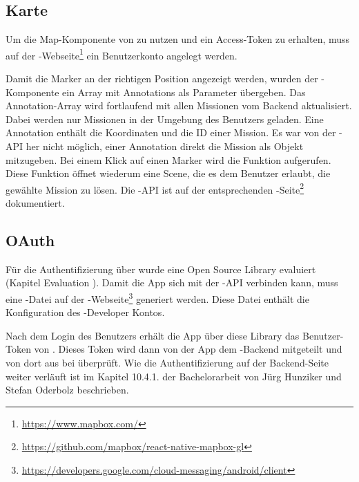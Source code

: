 \subsection{Karte}
Um die Map-Komponente von  zu nutzen und ein Access-Token zu erhalten, muss auf der -Webseite\footnote{\url{https://www.mapbox.com/}} ein Benutzerkonto angelegt werden. 

Damit die Marker an der richtigen Position angezeigt werden, wurden der -Komponente ein Array mit Annotations als Parameter übergeben. 
Das Annotation-Array wird fortlaufend mit allen Missionen vom \gls{Backend} aktualisiert. 
Dabei werden nur Missionen in der Umgebung des Benutzers geladen. 
Eine Annotation enthält die Koordinaten und die ID einer Mission. 
Es war von der -\gls{API} her nicht möglich, einer Annotation direkt die Mission als Objekt mitzugeben. 
Bei einem Klick auf einen Marker wird die Funktion  aufgerufen.
Diese Funktion öffnet wiederum eine Scene, die es dem Benutzer erlaubt, die gewählte Mission zu lösen.
Die -\gls{API} ist auf der entsprechenden -Seite\footnote{\url{https://github.com/mapbox/react-native-mapbox-gl}} dokumentiert. 


\subsection{OAuth}
Für die Authentifizierung über  wurde eine Open Source \gls{Library} evaluiert (Kapitel Evaluation ). 
Damit die App sich mit der -\gls{API} verbinden kann, muss eine -Datei auf der -Webseite\footnote{\url{https://developers.google.com/cloud-messaging/android/client}} generiert werden. 
Diese Datei enthält die Konfiguration des -Developer Kontos. 

Nach dem Login des Benutzers erhält die App über diese \gls{Library} das Benutzer-Token von .
Dieses Token wird dann von der App dem \kort{}-\gls{Backend} mitgeteilt und von dort aus bei  überprüft. 
Wie die Authentifizierung auf der \gls{Backend}-Seite weiter verläuft ist im Kapitel 10.4.1. der Bachelorarbeit von Jürg Hunziker und Stefan Oderbolz beschrieben.\cite{ba-kort-2012}